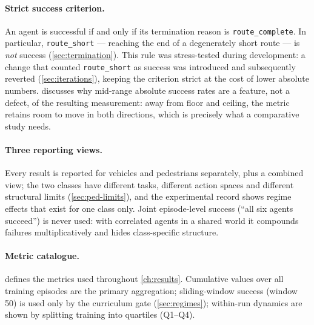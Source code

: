 \paragraph{Strict success criterion.}
An agent is successful if and only if its termination reason is
\texttt{route\_complete}. In particular, \texttt{route\_short} --- reaching
the end of a degenerately short route --- is \emph{not} success
(\cref{sec:termination}). This rule was stress-tested during development:
a change that counted \texttt{route\_short} as success was introduced and
subsequently reverted (\cref{sec:iterations}), keeping the criterion
strict at the cost of lower absolute numbers. 
discusses why mid-range absolute success rates are a feature, not a
defect, of the resulting measurement: away from floor and ceiling, the
metric retains room to move in both directions, which is precisely what a
comparative study needs.

\paragraph{Three reporting views.}
Every result is reported for vehicles and pedestrians separately, plus a
combined view; the two classes have different tasks, different action
spaces and different structural limits (\cref{sec:ped-limits}), and the
experimental record shows regime effects that exist for one class only.
Joint episode-level success (``all six agents succeed'') is never used:
with correlated agents in a shared world it compounds failures
multiplicatively and hides class-specific structure.

\paragraph{Metric catalogue.}
 defines the metrics used throughout
\cref{ch:results}. Cumulative values over all training episodes are the
primary aggregation; sliding-window success (window 50) is used only by
the curriculum gate (\cref{sec:regimes}); within-run dynamics are shown
by splitting training into quartiles (Q1--Q4).

